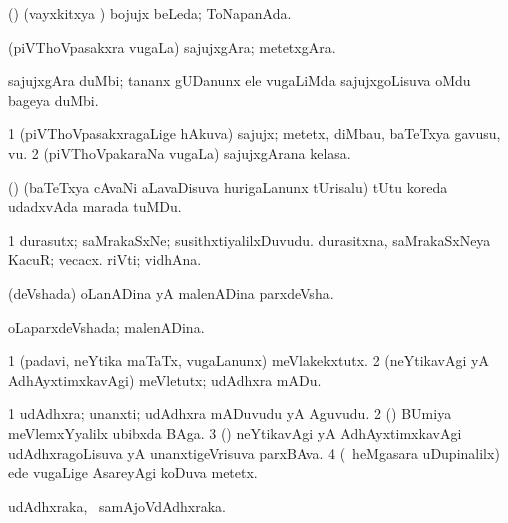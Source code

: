 \noindent
\gl{\pagu}
\expl{}
\bmng
{}  (\hA) (vayxkitxya \vi) bojujx beLeda; ToNapanAda. 
\emng
\eentry

\bentry
{} 
\gl{\nA}
\expl{}
\bmng
(piVThoVpasakxra \mo vugaLa) sajujxgAra; metetxgAra. 
\emng
\eentry

\bentry
{} 
\gl{\nA}
\expl{}
\bmng
sajujxgAra duMbi; tananx gUDanunx ele \mo vugaLiMda sajujxgoLisuva oMdu bageya duMbi. 
\emng
\eentry

\bentry
{} 
\gl{\nA}
\expl{}
\bmng
\bnum
\num{1} (piVThoVpasakxragaLige hAkuva) sajujx; metetx, diMbau, baTeTxya gavusu, \mo vu. 
\num{2} (piVThoVpakaraNa \mo vugaLa) sajujxgArana kelasa. 
\enum
\emng
\eentry

\bentry
{} 
\gl{\nA}
\expl{}
\bmng
(\nw) (baTeTxya cAvaNi aLavaDisuva hurigaLanunx tUrisalu) tUtu koreda udadxvAda marada tuMDu. 
\emng
\eentry

\bentry
{} 
\gl{\nA}
\bmng
\bnum
\num{1} durasutx; saMrakaSxNe; susithxtiyalilxDuvudu. 
 durasitxna, saMrakaSxNeya 
\banum
{} KacuR; vecacx. 
 riVti; vidhAna. 
\eanum
\numie
\enum
\emng
\eentry

\bentry
{} 
\gl{\nA}
\expl{}
\bmng
(deVshada) oLanADina yA malenADina parxdeVsha. 
\emng
\eentry

\bentry
{} 
\gl{\gu}
\expl{}
\bmng
oLaparxdeVshada; malenADina. 
\emng
\eentry

\bentry
{} 
\gl{\sakirx}
\expl{}
\bmng
\bnum
\num{1} (padavi, neYtika maTaTx, \mo vugaLanunx) meVlakekxtutx. 
\num{2} (neYtikavAgi yA AdhAyxtimxkavAgi) meVletutx; udAdhxra mADu. 
\enum
\emng
\eentry

\bentry
{} 
\gl{\nA}
\expl{}
\bmng
\bnum
\num{1} udAdhxra; unanxti; udAdhxra mADuvudu yA Aguvudu. 
\num{2} (\BUvi) BUmiya meVlemxYyalilx ubibxda BAga. 
\num{3} (\AmA) neYtikavAgi yA AdhAyxtimxkavAgi udAdhxragoLisuva yA unanxtigeVrisuva parxBAva. 
\num{4} (\kanmu\ heMgasara uDupinalilx) ede \mo vugaLige AsareyAgi koDuva metetx. 
\enum
\emng
\eentry

\bentry
{} 
\gl{\nA}
\expl{}
\bmng
udAdhxraka, \kanmu\ samAjoVdAdhxraka. 
\emng
\eentry

